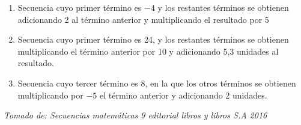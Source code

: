 \documentclass[12pt,a4paper]{article}
\begin{document}
\begin{enumerate}[label=\alph*.]
    \item Secuencia cuyo primer término es $-4$ y los restantes términos se obtienen adicionando 2 al término anterior y multiplicando el resultado por 5

    \item Secuencia cuyo primer término es 24, y los restantes términos se obtienen multiplicando el término anterior por 10 y adicionando 5,3 unidades al resultado.

    \item Secuencia cuyo tercer término es 8, en la que los otros términos se obtienen multiplicando por $-5$ el término anterior y adicionando 2 unidades.
\end{enumerate}

\textit{Tomado de: Secuencias matemáticas 9 editorial libros y libros S.A 2016}

\vspace{1cm}
\end{document}
